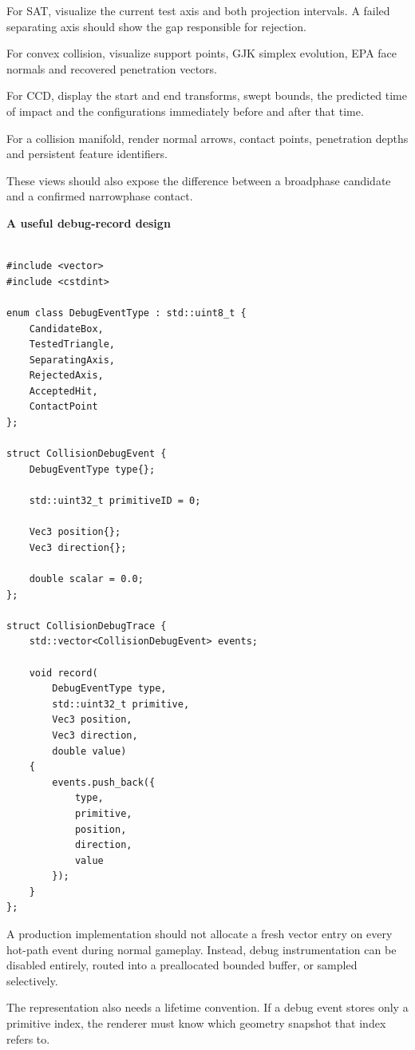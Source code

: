 For SAT, visualize the current test axis and both projection intervals. A failed separating axis should show the gap responsible for rejection.

For convex collision, visualize support points, GJK simplex evolution, EPA face normals and recovered penetration vectors.

For CCD, display the start and end transforms, swept bounds, the predicted time of impact and the configurations immediately before and after that time.

For a collision manifold, render normal arrows, contact points, penetration depths and persistent feature identifiers.

These views should also expose the difference between a broadphase candidate and a confirmed narrowphase contact.

\textbf{A useful debug-record design}

\begin{verbatim}

#include <vector>
#include <cstdint>

enum class DebugEventType : std::uint8_t {
    CandidateBox,
    TestedTriangle,
    SeparatingAxis,
    RejectedAxis,
    AcceptedHit,
    ContactPoint
};

struct CollisionDebugEvent {
    DebugEventType type{};

    std::uint32_t primitiveID = 0;

    Vec3 position{};
    Vec3 direction{};

    double scalar = 0.0;
};

struct CollisionDebugTrace {
    std::vector<CollisionDebugEvent> events;

    void record(
        DebugEventType type,
        std::uint32_t primitive,
        Vec3 position,
        Vec3 direction,
        double value)
    {
        events.push_back({
            type,
            primitive,
            position,
            direction,
            value
        });
    }
};
\end{verbatim}

A production implementation should not allocate a fresh vector entry on every hot-path event during normal gameplay. Instead, debug instrumentation can be disabled entirely, routed into a preallocated bounded buffer, or sampled selectively.

The representation also needs a lifetime convention. If a debug event stores only a primitive index, the renderer must know which geometry snapshot that index refers to.

